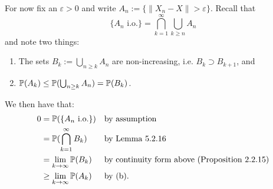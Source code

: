 For now fix an $\varepsilon > 0$ and write $A_n := \{\|X_n - X\| > \varepsilon\}$. Recall that
\[
	\{A_n \text{ i.o.}\} = \bigcap_{k = 1}^\infty \bigcup_{k \ge n} A_n
\]
and note two things:
\begin{enumerate}[label={(\alph*)}]
\item The sets $B_k := \bigcup_{n \ge k} A_n$ are non-increasing, i.e. $B_k \supset B_{k+1}$, and
\item $\mathbb P(A_k) \le \mathbb P(\bigcup_{n \ge k} A_n) = \mathbb P(B_k)$.
\end{enumerate}
 
We then have that:
\begin{align*}
	0 &= \mathbb P(\{A_n \text{ i.o.}\}) &&\text{by assumption} \\
	&= \mathbb P(\bigcap_{k =1}^\infty B_k) &&\text{by Lemma 5.2.16}\\
	&= \lim_{k \to \infty} \mathbb P(B_k) &&\text{by continuity form above (Proposition 2.2.15)}\\
	&\ge \lim_{k \to \infty} \mathbb P(A_k) &&\text{by (b)}.
\end{align*}
